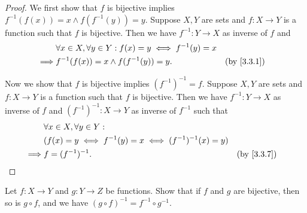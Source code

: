 \begin{proof}
  We first show that \(f\) is bijective implies \(f^{-1}(f(x)) = x \land f(f^{-1}(y)) = y\).
  Suppose \(X, Y\) are sets and \(f : X \to Y\) is a function such that \(f\) is bijective.
  Then we have \(f^{-1} : Y \to X\) as inverse of \(f\) and
  \begin{align*}
             & \forall x \in X, \forall y \in Y : f(x) = y \iff f^{-1}(y) = x                 \\
    \implies & f^{-1}(f(x)) = x \land f(f^{-1}(y)) = y.                       &  & \by{3.3.1}
  \end{align*}

  Now we show that \(f\) is bijective implies \((f^{-1})^{-1} = f\).
  Suppose \(X, Y\) are sets and \(f : X \to Y\) is a function such that \(f\) is bijective.
  Then we have \(f^{-1} : Y \to X\) as inverse of \(f\) and \((f^{-1})^{-1} : X \to Y\) as inverse of \(f^{-1}\) such that
  \begin{align*}
             & \forall x \in X, \forall y \in Y :                                      \\
             & (f(x) = y \iff f^{-1}(y) = x \iff (f^{-1})^{-1}(x) = y)                 \\
    \implies & f = (f^{-1})^{-1}.                                      &  & \by{3.3.7}
  \end{align*}
\end{proof}

\begin{ex}\label{ex:3.3.7}
  Let \(f : X \to Y\) and \(g : Y \to Z\) be functions.
  Show that if \(f\) and \(g\) are bijective, then so is \(g \circ f\), and we have \((g \circ f)^{-1} = f^{-1} \circ g^{-1}\).
\end{ex}

